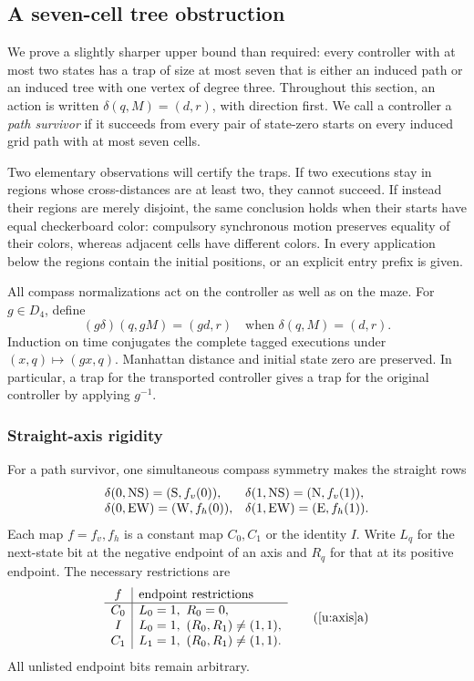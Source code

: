 \subsection{A seven-cell tree obstruction}\label{u:section}

We prove a slightly sharper upper bound than required: every controller
with at most two states has a trap of size at most seven that is either
an induced path or an induced tree with one vertex of degree three.
Throughout this section, an action is written
$\delta(q,M)=(d,r)$, with direction first. We call a controller a
\emph{path survivor} if it succeeds from every pair of state-zero starts
on every induced grid path with at most seven cells.

Two elementary observations will certify the traps. If two executions
stay in regions whose cross-distances are at least two, they cannot
succeed. If instead their regions are merely disjoint, the same conclusion
holds when their starts have equal checkerboard color: compulsory
synchronous motion preserves equality of their colors, whereas adjacent
cells have different colors. In every application below the regions
contain the initial positions, or an explicit entry prefix is given.

All compass normalizations act on the controller as well as on the
maze. For $g\in D_4$, define
\[
 (g\delta)(q,gM)=(gd,r)\quad\text{when }\delta(q,M)=(d,r).
\]
Induction on time conjugates the complete tagged executions under
$(x,q)\mapsto(gx,q)$. Manhattan distance and initial state zero are
preserved. In particular, a trap for the transported controller gives
a trap for the original controller by applying $g^{-1}$.

\subsubsection{Straight-axis rigidity}

\begin{lemma}\label{u:axis}
For a path survivor, one simultaneous compass symmetry makes the
straight rows
\[
\begin{array}{ll}
\delta(0,\mathrm{NS})=(\mathrm{S},f_v(0)),&
\delta(1,\mathrm{NS})=(\mathrm{N},f_v(1)),\\
\delta(0,\mathrm{EW})=(\mathrm{W},f_h(0)),&
\delta(1,\mathrm{EW})=(\mathrm{E},f_h(1)).
\end{array}
\]
Each map $f=f_v,f_h$ is a constant map $C_0,C_1$ or the identity $I$.
Write $L_q$ for the next-state bit at the negative endpoint of an axis
and $R_q$ for that at its positive endpoint. The necessary restrictions are
\[
\begin{array}{c|l}
f&\text{endpoint restrictions}\\ \hline
C_0&L_0=1,\ R_0=0,\\
I&L_0=1,\ (R_0,R_1)\ne(1,1),\\
C_1&L_1=1,\ (R_0,R_1)\ne(1,1).
\end{array}\tag{\ref{u:axis}a}
\]
All unlisted endpoint bits remain arbitrary.
\end{lemma}

